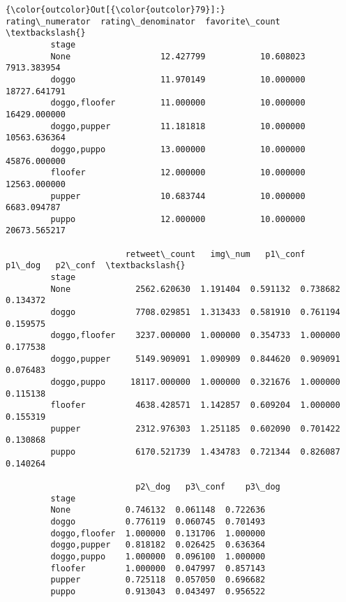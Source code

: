\documentclass[11pt]{article}
\begin{document}
\begin{Verbatim}[commandchars=\\\{\}]
{\color{outcolor}Out[{\color{outcolor}79}]:}                rating\_numerator  rating\_denominator  favorite\_count  \textbackslash{}
         stage                                                                 
         None                  12.427799           10.608023     7913.383954   
         doggo                 11.970149           10.000000    18727.641791   
         doggo,floofer         11.000000           10.000000    16429.000000   
         doggo,pupper          11.181818           10.000000    10563.636364   
         doggo,puppo           13.000000           10.000000    45876.000000   
         floofer               12.000000           10.000000    12563.000000   
         pupper                10.683744           10.000000     6683.094787   
         puppo                 12.000000           10.000000    20673.565217   
         
                        retweet\_count   img\_num   p1\_conf    p1\_dog   p2\_conf  \textbackslash{}
         stage                                                                  
         None             2562.620630  1.191404  0.591132  0.738682  0.134372   
         doggo            7708.029851  1.313433  0.581910  0.761194  0.159575   
         doggo,floofer    3237.000000  1.000000  0.354733  1.000000  0.177538   
         doggo,pupper     5149.909091  1.090909  0.844620  0.909091  0.076483   
         doggo,puppo     18117.000000  1.000000  0.321676  1.000000  0.115138   
         floofer          4638.428571  1.142857  0.609204  1.000000  0.155319   
         pupper           2312.976303  1.251185  0.602090  0.701422  0.130868   
         puppo            6170.521739  1.434783  0.721344  0.826087  0.140264   
         
                          p2\_dog   p3\_conf    p3\_dog  
         stage                                        
         None           0.746132  0.061148  0.722636  
         doggo          0.776119  0.060745  0.701493  
         doggo,floofer  1.000000  0.131706  1.000000  
         doggo,pupper   0.818182  0.026425  0.636364  
         doggo,puppo    1.000000  0.096100  1.000000  
         floofer        1.000000  0.047997  0.857143  
         pupper         0.725118  0.057050  0.696682  
         puppo          0.913043  0.043497  0.956522  
\end{Verbatim}
            
\end{document}
